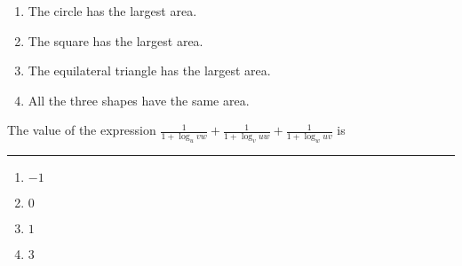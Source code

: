 \begin{enumerate}
    \item The circle has the largest area.
\item  The square has the largest area.
\item  The equilateral triangle has the largest area.
\item  All the three shapes have the same area.
\end{enumerate}
\item The value of the expression $\frac{1}{1+\log_u{vw}}+\frac{1}{1+\log_v{uw}}+\frac{1}{1+\log_w{uv}}$ is \rule{3cm}{0.15mm}
\begin{multicols}{4}
    \begin{enumerate}
        \item $-1$
        \item $0$
        \item $1$
        \item $3$
    \end{enumerate}
\end{multicols}
